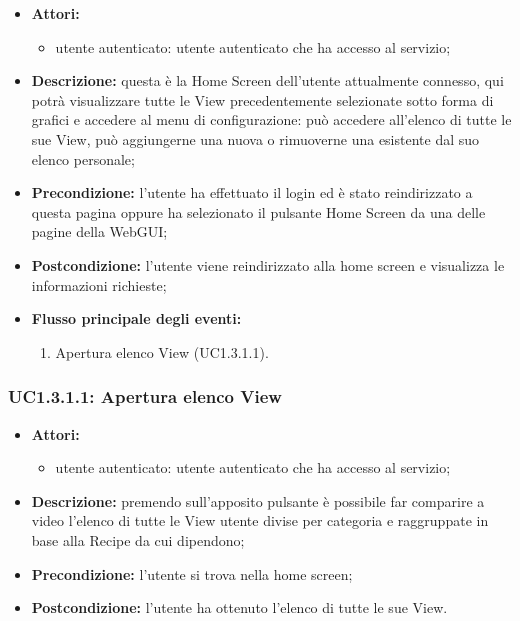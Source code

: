 \begin{itemize}
	\item \textbf{Attori:}
	\begin{itemize}
		\item utente autenticato: utente autenticato che ha accesso al servizio;
	\end{itemize}
	\item \textbf{Descrizione:} questa è la Home Screen dell'utente attualmente connesso, qui potrà visualizzare tutte le View precedentemente selezionate sotto forma di grafici e accedere al menu di configurazione: può accedere all'elenco di tutte le sue View, può aggiungerne una nuova o rimuoverne una esistente dal suo elenco personale;
	\item \textbf{Precondizione:} l'utente ha effettuato il login ed è stato reindirizzato a questa pagina oppure ha selezionato il pulsante Home Screen da una delle pagine della WebGUI;
	\item \textbf{Postcondizione:} l'utente viene reindirizzato alla home screen e visualizza le informazioni richieste;
	\item \textbf{Flusso principale degli eventi:}
	\begin{enumerate}
		\item Apertura elenco View (UC1.3.1.1).
	\end{enumerate}
\end{itemize}

\subsubsection{UC1.3.1.1: Apertura elenco View}

\begin{itemize}
	\item \textbf{Attori:}
	\begin{itemize}
		\item utente autenticato: utente autenticato che ha accesso al servizio;
	\end{itemize}
	\item \textbf{Descrizione:} premendo sull'apposito pulsante è possibile far comparire a video l'elenco di tutte le View utente divise per categoria e raggruppate in base alla Recipe da cui dipendono;
	\item \textbf{Precondizione:} l'utente si trova nella home screen;
	\item \textbf{Postcondizione:} l'utente ha ottenuto l'elenco di tutte le sue View.
\end{itemize}

